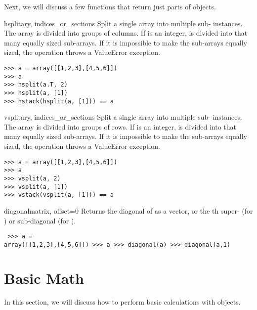 Next, we will discuss a few functions that return just parts of 
objects.

\begin{funcdesc}{hsplit}{ary, indices_or_sections}
  Split a single  array into multiple sub-
  instances.  The array is divided into groups of columns.  If
   is an integer,  is divided into that
  many equally sized sub-arrays.  If it is impossible to make the sub-arrays
  equally sized, the operation throws a ValueError exception. 
  
\begin{verbatim}
>>> a = array([[1,2,3],[4,5,6]])
>>> a
>>> hsplit(a.T, 2)
>>> hsplit(a, [1])
>>> hstack(hsplit(a, [1])) == a
\end{verbatim}
\end{funcdesc}

\begin{funcdesc}{vsplit}{ary, indices_or_sections}
  Split a single  array into multiple sub-
  instances.  The array is divided into groups of rows.  If
   is an integer,  is divided into that
  many equally sized sub-arrays.  If it is impossible to make the sub-arrays
  equally sized, the operation throws a ValueError exception. 
  
\begin{verbatim}
>>> a = array([[1,2,3],[4,5,6]])
>>> a
>>> vsplit(a, 2)
>>> vsplit(a, [1])
>>> vstack(vsplit(a, [1])) == a
\end{verbatim}
\end{funcdesc}

\begin{funcdesc}{diagonal}{matrix, offset=0} Returns the diagonal of
 as a vector, or the th super- (for ) or
sub-diagonal (for ).  \begin{verbatim} >>> a =
array([[1,2,3],[4,5,6]]) >>> a >>> diagonal(a) >>> diagonal(a,1) \end{verbatim}
\end{funcdesc}
\section{Basic  Math}
In this section, we will discuss how to perform basic calculations with
 objects. 


